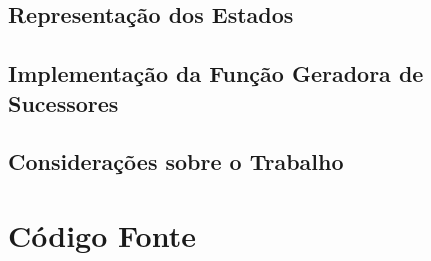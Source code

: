 \documentclass[brazil,times]{abnt}
\begin{document}
\section*{Representação dos Estados}


\section*{Implementação da Função Geradora de Sucessores}


\section*{Considerações sobre o Trabalho}


\chapter*{Código Fonte}
	



\end{document}
